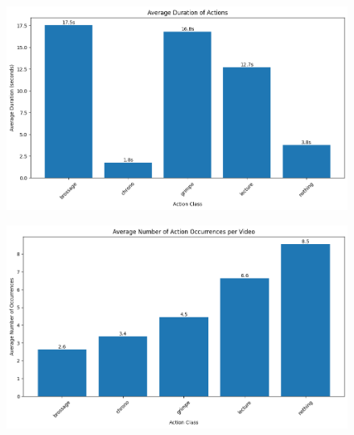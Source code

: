 \begin{figure}[t]
    \centering
    \begin{minipage}{0.245\textwidth}
        \centering
        \includegraphics[width=\textwidth]{assets/figures/average-duration-of-actions.png}
        \label{fig:distribution-of-actions-in-dataset}
    \end{minipage}%
    \hspace{0.02\textwidth} %
    \begin{minipage}{0.245\textwidth}
        \centering
        \includegraphics[width=\textwidth]{assets/figures/average-number-of-action-occurences-per-video.png}
        \label{fig:average-number-of-action-occurences-per-video}
    \end{minipage}%
    \hspace{0.02\textwidth} %
    \begin{minipage}{0.245\textwidth}
        \centering

\end{minipage}
\end{figure}
